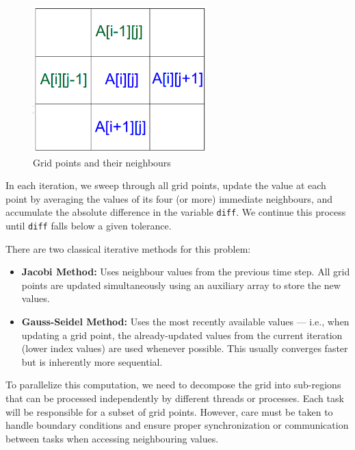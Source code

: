 \documentclass[12pt]{book}
\begin{document}
\begin{figure}[H]
    \centering
    \includegraphics[width=0.6\textwidth]{images/grid.png}
    \caption{Grid points and their neighbours}
    \label{fig:grid}
\end{figure}

In each iteration, we sweep through all grid points, update the value at each point by averaging the values of its four (or more) immediate neighbours, and accumulate the absolute difference in the variable \texttt{diff}. We continue this process until \texttt{diff} falls below a given tolerance.

There are two classical iterative methods for this problem:

\begin{itemize}
    \item \textbf{Jacobi Method:} Uses neighbour values from the previous time step. All grid points are updated simultaneously using an auxiliary array to store the new values.
    
    \item \textbf{Gauss-Seidel Method:} Uses the most recently available values — i.e., when updating a grid point, the already-updated values from the current iteration (lower index values) are used whenever possible. This usually converges faster but is inherently more sequential.
\end{itemize}

To parallelize this computation, we need to decompose the grid into sub-regions that can be processed independently by different threads or processes. Each task will be responsible for a subset of grid points. However, care must be taken to handle boundary conditions and ensure proper synchronization or communication between tasks when accessing neighbouring values.
\end{document}

